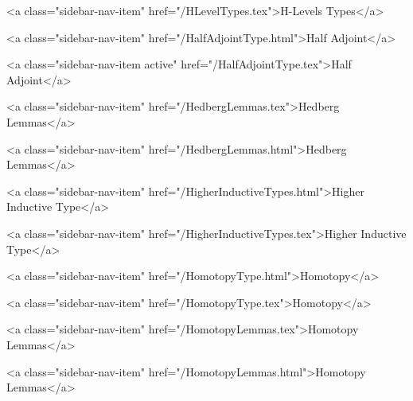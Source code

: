       
        
          <a class="sidebar-nav-item" href="/HLevelTypes.tex">H-Levels Types</a>
        
      
    
      
        
          <a class="sidebar-nav-item" href="/HalfAdjointType.html">Half Adjoint</a>
        
      
    
      
        
          <a class="sidebar-nav-item active" href="/HalfAdjointType.tex">Half Adjoint</a>
        
      
    
      
        
          <a class="sidebar-nav-item" href="/HedbergLemmas.tex">Hedberg Lemmas</a>
        
      
    
      
        
          <a class="sidebar-nav-item" href="/HedbergLemmas.html">Hedberg Lemmas</a>
        
      
    
      
        
          <a class="sidebar-nav-item" href="/HigherInductiveTypes.html">Higher Inductive Type</a>
        
      
    
      
        
          <a class="sidebar-nav-item" href="/HigherInductiveTypes.tex">Higher Inductive Type</a>
        
      
    
      
        
          <a class="sidebar-nav-item" href="/HomotopyType.html">Homotopy</a>
        
      
    
      
        
          <a class="sidebar-nav-item" href="/HomotopyType.tex">Homotopy</a>
        
      
    
      
        
          <a class="sidebar-nav-item" href="/HomotopyLemmas.tex">Homotopy Lemmas</a>
        
      
    
      
        
          <a class="sidebar-nav-item" href="/HomotopyLemmas.html">Homotopy Lemmas</a>
        
